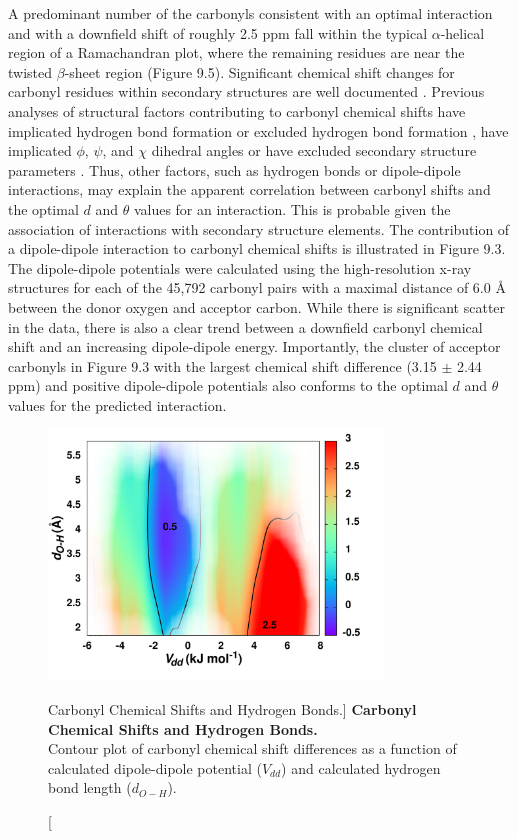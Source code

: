 \begin{doublespace}
A predominant number of the carbonyls consistent with an optimal \npistar{}
interaction and with a downfield shift of roughly 2.5 ppm fall within the
typical $\alpha$-helical region of a Ramachandran plot, where the remaining
residues are near the twisted $\beta$-sheet region (Figure 9.5). Significant
chemical shift changes for carbonyl residues within
secondary structures are well documented \cite{wang:protsci2002}.
Previous analyses of structural factors contributing to carbonyl \cnmr{}
chemical shifts have implicated hydrogen bond formation
\cite{dedios:sci1993,asakawa:jacs1992,wylie:jacs2007}
or excluded hydrogen bond formation
\cite{cisnetti:cpc2004,neal:jbnmr2003,markwick:jacs2004}, have
implicated $\phi$, $\psi$, and $\chi$ dihedral angles
\cite{neal:jbnmr2003} or have excluded secondary structure parameters
\cite{cisnetti:cpc2004,dedios:sci1993}. Thus, other factors,
such as hydrogen bonds or dipole-dipole interactions, may explain the apparent
correlation between carbonyl \cnmr{} shifts and the optimal $d$ and $\theta$
values for an \npistar{} interaction. This is probable given the association of
\npistar{} interactions with secondary structure elements. The contribution of
a dipole-dipole interaction to carbonyl \cnmr{} chemical shifts is illustrated
in Figure 9.3. The dipole-dipole potentials were calculated using the
high-resolution x-ray structures for each of the 45,792 carbonyl pairs with a
maximal distance of 6.0 \r{A} between the donor oxygen and acceptor carbon.
While there is significant scatter in the data, there is also a clear trend
between a downfield carbonyl \cnmr{} chemical shift and an increasing
dipole-dipole energy. Importantly, the cluster of acceptor carbonyls in
Figure 9.3 with the largest \cnmr{} chemical shift difference
(3.15 $\pm$ 2.44 ppm) and positive dipole-dipole potentials also conforms to
the optimal $d$ and $\theta$ values for the predicted \npistar{} interaction.
\end{doublespace}

\begin{figure}
\includegraphics[width=3.5in]{figs/npistar/06.png}
\caption
      [Carbonyl \cnmr{} Chemical Shifts and Hydrogen Bonds.]{
  {\bf Carbonyl \cnmr{} Chemical Shifts and Hydrogen Bonds.}
  \\
  Contour plot of \cnmr{} carbonyl chemical shift differences as a function
  of calculated dipole-dipole potential ($V_{dd}$) and calculated hydrogen
  bond length ($d_{O-H}$).
}
\end{figure}

